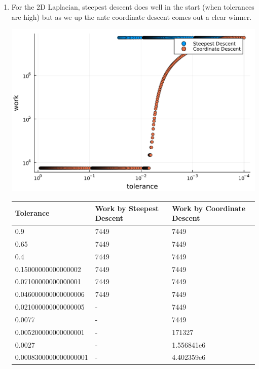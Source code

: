 \documentclass[]{exam}
\begin{document}
\begin{questions}
\begin{enumerate}[label=\arabic*.]
	\item For the 2D Laplacian, steepest descent does well in the start (when tolerances are high) but as we up the ante coordinate descent comes out a clear winner.
		\begin{center}
			\includegraphics[width=.7\textwidth]{code/q8-2.pdf}
		\end{center}
		\begin{table}[]
			\centering
			\begin{tabular}{@{}lll@{}}
				\toprule
				Tolerance             & Work by Steepest Descent & Work by Coordinate Descent \\ \midrule
				0.9                   & 7449                     & 7449                       \\
				0.65                  & 7449                     & 7449                       \\
				0.4                   & 7449                     & 7449                       \\
				0.15000000000000002   & 7449                     & 7449                       \\
				0.07100000000000001   & 7449                     & 7449                       \\
				0.046000000000000006  & 7449                     & 7449                       \\
				0.021000000000000005  & -                        & 7449                       \\
				0.0077                & -                        & 7449                       \\
				0.005200000000000001  & -                        & 171327                     \\
				0.0027                & -                        & 1.556841e6                 \\
				0.0008300000000000001 & -                        & 4.402359e6                 \\

\end{tabular}
\end{table}
\end{enumerate}
\end{questions}
\end{document}

